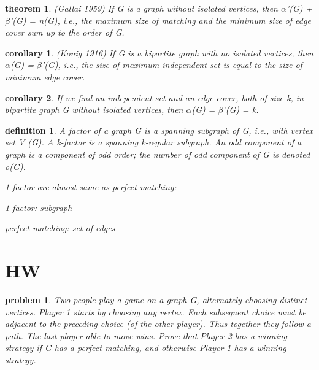 \documentclass[twocolumn]{article}
\newtheorem{theorem}{theorem}[section]  %
\newtheorem{definition}{definition}
\newtheorem{corollary}{corollary}
\newtheorem{problem}{problem}
\begin{document}
\begin{CJK*}{UTF8}{bkai}
    \begin{theorem}{(Gallai 1959)}
        If G is a graph without isolated vertices, then $\alpha$'(G) + $\beta$'(G) = n(G), i.e., the
 maximum size of matching and the minimum size of edge cover sum up to the
 order of G.
    \end{theorem}

    \begin{corollary}{(Konig 1916)}
        If G is a bipartite graph with no isolated vertices, then $\alpha$(G) = $\beta$'(G), i.e., the
 size of maximum independent set is equal to the size of minimum edge cover.
    \end{corollary}

    \begin{corollary}
        If we find an independent set and an edge cover, both of size k, in bipartite
 graph G without isolated vertices, then $\alpha$(G) = $\beta$'(G) = k.
    \end{corollary}

    \begin{definition}
        A factor of a graph G is a spanning subgraph of G, i.e., with vertex set V (G).
 A k-factor is a spanning k-regular subgraph. An odd component of a graph is
 a component of odd order; the number of odd component of G is denoted o(G).

 1-factor are almost same as perfect matching:

 1-factor: subgraph
 
 perfect matching: set of edges
    \end{definition}

\section{HW}

\begin{problem}
 Two people play a game on a graph G, alternately choosing distinct vertices. Player 1 starts by
 choosing any vertex. Each subsequent choice must be adjacent to the preceding choice (of the other
 player). Thus together they follow a path. The last player able to move wins.
 Prove that Player 2 has a winning strategy if G has a perfect matching, and otherwise Player 1 has
 a winning strategy.
\end{problem}


\end{CJK*}
\end{document}
